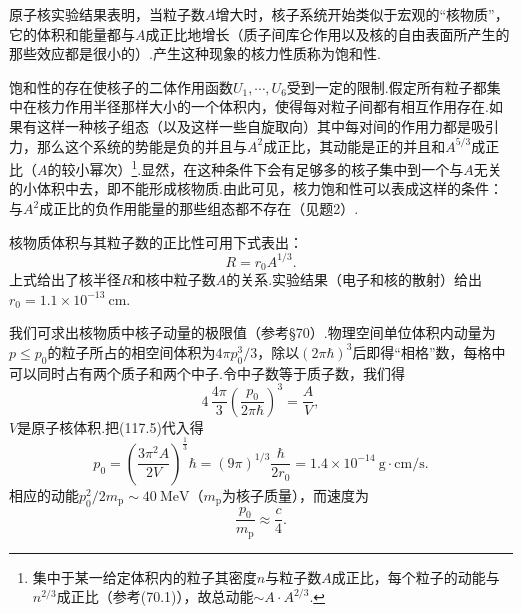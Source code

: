 原子核实验结果表明，当粒子数$A$增大时，核子系统开始类似于宏观的“核物质”，它的体积和能量都与$A$成正比地增长（质子间库仑作用以及核的自由表面所产生的那些效应都是很小的）.产生这种现象的核力性质称为饱和性.

饱和性的存在使核子的二体作用函数$U_1,\cdots,U_6$受到一定的限制.假定所有粒子都集中在核力作用半径那样大小的一个体积内，使得每对粒子间都有相互作用存在.如果有这样一种核子组态（以及这样一些自旋取向）其中每对间的作用力都是吸引力，那么这个系统的势能是负的并且与$A^2$成正比，其动能是正的并且和$A^{5/3}$成正比（$A$的较小幂次）\footnote{集中于某一给定体积内的粒子其密度$n$与粒子数$A$成正比，每个粒子的动能与$n^{2/3}$成正比（参考(70.1)），故总动能$\sim A\cdot A^{2/3}$.}.显然，在这种条件下会有足够多的核子集中到一个与$A$无关的小体积中去，即不能形成核物质.由此可见，核力饱和性可以表成这样的条件：与$A^2$成正比的负作用能量的那些组态都不存在（见题2）.

核物质体积与其粒子数的正比性可用下式表出：
\begin{equation}
  R=r_0A^{1/3}.
\end{equation}
上式给出了核半径$R$和核中粒子数$A$的关系.实验结果（电子和核的散射）给出$r_0=1.1\times10^{-13}\ \mathrm{cm}$.

我们可求出核物质中核子动量的极限值（参考§70）.物理空间单位体积内动量为$p\leqslant p_0$的粒子所占的相空间体积为$4\pi p_0^3/3$，除以$(2\pi\hbar)^3$后即得“相格”数，每格中可以同时占有两个质子和两个中子.令中子数等于质子数，我们得
\begin{equation*}
  4\,\frac{4\pi}{3}\left(\frac{p_0}{2\pi\hbar}\right)^3=\frac{A}{V},
\end{equation*}
$V$是原子核体积.把(117.5)代入得
\begin{equation*}
  p_0=\left(\frac{3\pi^2A}{2V}\right)^{\frac{1}{3}}\hbar
  =(9\pi)^{1/3}\frac{\hbar}{2r_0}
  =1.4\times10^{-14}\ \mathrm{g}\cdot\mathrm{cm/s}.
\end{equation*}
相应的动能$p_0^2/2m_\mathrm{p}\sim40\ \mathrm{MeV}$（$m_\mathrm{p}$为核子质量），而速度为
\begin{equation*}
  \frac{p_0}{m_\mathrm{p}}\approx\frac{c}{4}.
\end{equation*}

